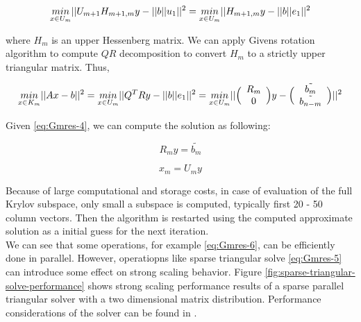 \begin{equation} \label{eq:Gmres-3}
	\underset{x \in U_m}{min}||U_{m+1}H_{m+1,m} y - ||b||u_1||^2 = \\
	\underset{x \in U_m}{min}||H_{m+1,m} y - ||b||e_1||^2 
\end{equation}

where $H_m$ is an upper Hessenberg matrix. We can apply Givens rotation algorithm to compute $QR$ decomposition to convert $H_m$ to a strictly upper triangular matrix. Thus,

 
\begin{equation} \label{eq:Gmres-4}
	\underset{x \in K_m}{min}||Ax - b||^2 = \\
	\underset{x \in U_m}{min}||Q^TRy - ||b||e_1||^2 = \\
	\underset{x \in U_m}{min}||\Big(\begin{array}{c c}R_m \\ 0 \\\end{array}\Big) y - \Big(\begin{array}{c c} \tilde{b_m} \\ \tilde{b_{n-m}} \\\end{array}\Big)||^2
\end{equation}

Given \ref{eq:Gmres-4}, we can compute the solution as following:

\begin{equation} \label{eq:Gmres-5}
	R_m y = \tilde{b_m}
\end{equation}


\begin{equation} \label{eq:Gmres-6}
	x_m = U_m y  
\end{equation}

Because of large computational and storage costs, in case of evaluation of the full Krylov subspace, only small a subspace is computed, typically first 20 - 50 column vectors. Then the algorithm is restarted using the computed approximate solution as a initial guess for the next iteration.\\

We can see that some operations, for example \ref{eq:Gmres-6}, can be efficiently done in parallel. However, operatiopns like sparse triangular solve \ref{eq:Gmres-5} can introduce some effect on strong scaling behavior. Figure \ref{fig:sparse-triangular-solve-performance} shows strong scaling performance results of a sparse parallel triangular solver with a two dimensional matrix distribution. Performance considerations of the solver can be found in \cite{sparse-la:triangular-solve}.\\

